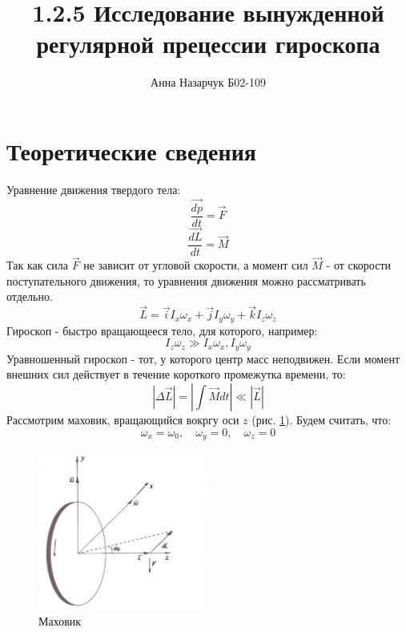 \documentclass[a4paper,12pt]{article} %
\author{Анна Назарчук Б02-109}
\title{1.2.5 Исследование вынужденной регулярной прецессии гироскопа}
\date{}
\begin{document}
\maketitle
\section{Теоретические сведения}
Уравнение движения твердого тела:
\begin{equation}
\frac{\overrightarrow{dp}}{dt}=\overrightarrow{F}
\end{equation}
\begin{equation}
\frac{\overrightarrow{dL}}{dt}=\overrightarrow{M}
\end{equation}
Так как сила $\overrightarrow{F}$ не зависит от угловой скорости, а момент сил $\overrightarrow{M}$ - от скорости поступательного движения, то уравнения движения можно рассматривать отдельно.
\begin{equation}
\overrightarrow{L}=\overrightarrow{i}I_x\omega_x+\overrightarrow{j}I_y\omega_y+\overrightarrow{k}I_z\omega_z
\end{equation}
Гироскоп  - быстро вращающееся тело, для которого, например:
\begin{equation}
I_z\omega_z\gg I_x\omega_x, I_y\omega_y
\end{equation}
Уравношенный гироскоп - тот, у которого центр масс неподвижен.
Если момент внешних сил действует в течение короткого промежутка времени, то:
\begin{equation}
|\Delta \overrightarrow{L}|=|\int \overrightarrow{M}dt|\ll |\overrightarrow{L}|
\end{equation}
Рассмотрим маховик, вращающийся вокргу оси $z$ (рис. \ref{маховик}). Будем считать, что:
\begin{equation}
\omega_x=\omega_0,\quad		\omega_y=0, \quad	\omega_z=0
\end{equation}
\begin{figure}[h!]
\begin{center}
\includegraphics[width=0.5\textwidth]{Маховик}
\end{center}
\caption{Маховик} \label{маховик}
\end{figure}
\end{document}
